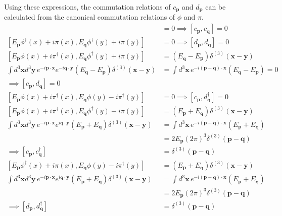 \documentclass[a4paper,11pt]{article}
\begin{document}
Using these expressions, the commutation relations of $c_{\mathbf{p}}$ and $d_{\mathbf{p}}$ can be calculated from the canonical commutation relations of $\phi$ and $\pi$.
\begin{align}
    [E_{\mathbf{p}}\phi(x) + i\pi^\dagger(x), E_{\mathbf{q}}\phi(y) + i\pi^\dagger(y)]
    &= 0 \implies  [c_{\mathbf{p}}, c_{\mathbf{q}}] = 0\\
    [E_{\mathbf{p}}\phi^\dagger(x) + i\pi(x), E_{\mathbf{q}}\phi^\dagger(y) + i\pi(y)]
    &= 0 \implies  [d_{\mathbf{p}}, d_{\mathbf{q}}] = 0\\
    [E_{\mathbf{p}}\phi(x) + i\pi^\dagger(x), E_{\mathbf{q}}\phi^\dagger(y) + i\pi(y)]
    &= (E_{\mathbf{q}}-E_{\mathbf{p}})\delta^{(3)}(\mathbf{x}-\mathbf{y})\\
    \int d^3\mathbf{x} d^3\mathbf{y}\,e^{-i\mathbf{p}\cdot\mathbf{x}}e^{-i\mathbf{q}\cdot\mathbf{y}}(E_{\mathbf{q}}-E_{\mathbf{p}})\delta^{(3)}(\mathbf{x}-\mathbf{y}) &= \int d^3\mathbf{x}\, e^{-i(\mathbf{p}+\mathbf{q})\cdot\mathbf{x}}(E_{\mathbf{q}}-E_{\mathbf{p}}) = 0\\
    \implies [c_{\mathbf{p}}, d_{\mathbf{q}}] = 0\\
    [E_{\mathbf{p}}\phi(x) + i\pi^\dagger(x), E_{\mathbf{q}}\phi(y) - i\pi^\dagger(y)] &= 0 \implies [c_{\mathbf{p}}, d_{\mathbf{q}}^\dagger] = 0\\
    [E_{\mathbf{p}}\phi(x) + i\pi^\dagger(x), E_{\mathbf{q}}\phi^\dagger(y) - i\pi(y)] &= (E_{\mathbf{p}} + E_{\mathbf{q}})\delta^{(3)}(\mathbf{x}-\mathbf{y}) \\
    \int d^3\mathbf{x} d^3\mathbf{y}\,e^{-i\mathbf{p}\cdot\mathbf{x}}e^{i\mathbf{q}\cdot\mathbf{y}}(E_{\mathbf{p}} + E_{\mathbf{q}})\delta^{(3)}(\mathbf{x}-\mathbf{y}) &= \int d^3\mathbf{x}\, e^{-i(\mathbf{p}-\mathbf{q})\cdot\mathbf{x}}(E_{\mathbf{p}} + E_{\mathbf{q}}) \\
    &= 2E_{\mathbf{p}}(2\pi)^3\delta^{(3)}(\mathbf{p}-\mathbf{q})\\
    \implies [c_{\mathbf{p}}, c_{\mathbf{q}}^\dagger] &= \delta^{(3)}(\mathbf{p}-\mathbf{q})\\
    [E_{\mathbf{p}}\phi^\dagger(x) + i\pi(x), E_{\mathbf{q}}\phi(y) - i\pi^\dagger(y)] &= (E_{\mathbf{p}} + E_{\mathbf{q}})\delta^{(3)}(\mathbf{x}-\mathbf{y}) \\
    \int d^3\mathbf{x} d^3\mathbf{y}\,e^{-i\mathbf{p}\cdot\mathbf{x}}e^{i\mathbf{q}\cdot\mathbf{y}}(E_{\mathbf{p}} + E_{\mathbf{q}})\delta^{(3)}(\mathbf{x}-\mathbf{y}) &= \int d^3\mathbf{x}\, e^{-i(\mathbf{p}-\mathbf{q})\cdot\mathbf{x}}(E_{\mathbf{p}} + E_{\mathbf{q}}) \\
    &= 2E_{\mathbf{p}}(2\pi)^3\delta^{(3)}(\mathbf{p}-\mathbf{q})\\
    \implies [d_{\mathbf{p}}, d_{\mathbf{q}}^\dagger] &= \delta^{(3)}(\mathbf{p}-\mathbf{q})
\end{align}
\end{document}
